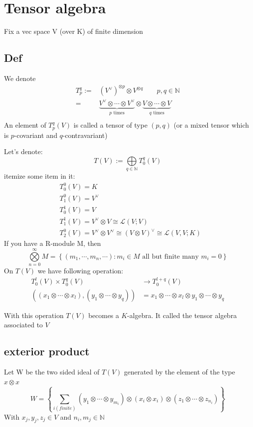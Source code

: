 \documentclass{book}
\begin{document}
\chapter{Tensor algebra}
Fix a vec space V (over K) of finite dimension
\section{Def}
We denote
$$
\begin{aligned}
    T_p^q:=&(V^\vee)^{\otimes p}\otimes V^{\otimes q}\qquad p,q\in \mathbb{N}\\
    =&\underbrace{V^\vee\otimes\cdots\otimes V^\vee}\limits_{p\text{ times}}\otimes \underbrace{V\otimes\cdots\otimes V}\limits_{q\text{ times}}\\
\end{aligned}
$$
An element of $T_p^q(V)$ is called a tensor of type $(p,q)$ (or a mixed tensor which is $p$-covariant and $q$-contravariant)

Let's denote:
$$T(V):=\bigoplus\limits_{q\in \mathbb{N}} T_0^q(V)$$
itemize some item in it:
$$\begin{aligned}
    &T_0^0(V)=K\\
    &T_1^0(V)=V^\vee\\
    &T_0^1(V)=V\\
    &T_1^1(V)=V^\vee\otimes V\cong\mathscr{L}(V;V)\\
    &T_2^0(V)=V^\vee\otimes V^\vee\cong (V\otimes V)^\vee\cong\mathscr{L}(V,V;K)
\end{aligned}$$
If you have a R-module M, then 
$$\bigotimes\limits_{n=0}^\infty M=\left\{(m_1,\cdots,m_n,\cdots):m_i\in M \text{ all but finite many }m_i=0\right\}$$
On $T(V)$ we have following operation:
$$
\begin{aligned}
    T_0^l(V)\times T_0^q(V)&\rightarrow T_0^{l+q}(V)\\
    ((x_1\otimes\cdots\otimes x_l),(y_1\otimes\cdots\otimes y_q))&= x_1\otimes\cdots\otimes x_l\otimes y_1\otimes\cdots\otimes y_q
\end{aligned}
$$

With this operation $T(V)$ becomes a $K$-algebra. It called the tensor algebra associated to $V$
\section{exterior product}
Let W be the two sided ideal of $T(V)$ generated by the element of the type $x\otimes x$
$$W=\left\{\sum\limits_{i(finite)}(y_1\otimes\cdots\otimes y_{m_i})\otimes(x_i\otimes x_i)\otimes(z_1\otimes\cdots\otimes z_{n_i})\right\} $$
With $x_j,y_j,z_j\in V$ and $n_i,m_j\in \mathbb{N}$
\end{document}
